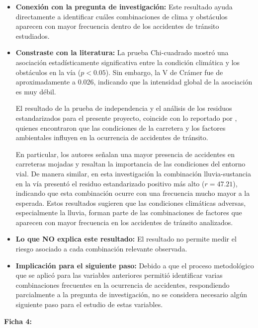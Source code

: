\documentclass[12pt]{article}
\begin{document}
\begin{itemize}
    \item \textbf{Conexión con la pregunta de investigación:} Este resultado ayuda 
    directamente a identificar cuáles combinaciones de clima
    y obstáculos aparecen con mayor frecuencia dentro de los accidentes de tránsito estudiados. 

	\item \textbf{Constraste con la literatura:} La prueba Chi-cuadrado mostró una 
	asociación estadísticamente significativa entre la condición climática y los obstáculos 
	en la vía 
    ($p<0.05$). Sin embargo, la V de Crámer fue de aproximadamente a 0.026, indicando 
    que la intensidad global de la asociación es muy débil.

    El resultado de la prueba de independencia y el análisis de los residuos estandarizados 
    para el presente proyecto,
    coincide con lo reportado por \textcite{KARZAN2017}, quienes encontraron que 
    las condiciones de la carretera y los factores ambientales influyen en la 
    ocurrencia de accidentes de tránsito. 
    
    En particular, los autores señalan una mayor presencia de accidentes en carreteras mojadas y resaltan la importancia de las condiciones del entorno vial. 
    De manera similar, en esta investigación la combinación lluvia-sustancia en la vía presentó el residuo estandarizado positivo más alto 
    ($r=47.21$), indicando que esta combinación ocurre con una frecuencia mucho mayor a la esperada. 
    Estos resultados sugieren que las condiciones climáticas adversas, especialmente la lluvia, forman 
    parte de las combinaciones de factores que aparecen con mayor frecuencia en los accidentes de tránsito analizados.
	
	\item \textbf{Lo que NO explica este resultado:} El resultado no permite medir el riesgo asociado a cada combinación relevante observada.
    \item \textbf{Implicación para el siguiente paso:} Debido a que el proceso metodológico que se aplicó para las variables anteriores permitió
    identificar varias combinaciones frecuentes en la ocurrencia de accidentes, respondiendo parcialmente a la pregunta de investigación, no se considera
    necesario algún siguiente paso para el estudio de estas variables.\\
\end{itemize} 


\textbf{Ficha 4:}
\end{document}
